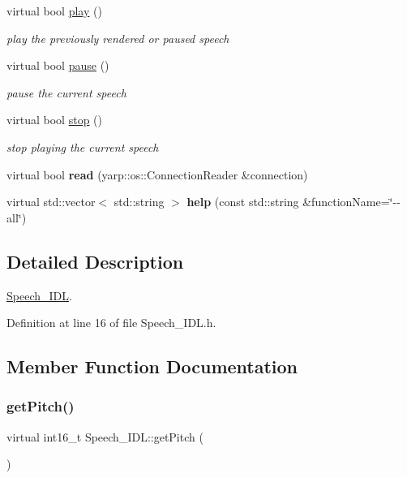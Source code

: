 \begin{DoxyCompactItemize}
\mbox{\label{classSpeech__IDL_a9b3187a4d3fd105cef6af2c71cde0eb6}} 
virtual bool \hyperlink{classSpeech__IDL_a9b3187a4d3fd105cef6af2c71cde0eb6}{play} ()
\begin{DoxyCompactList}\small\item\em play the previously rendered or paused speech \end{DoxyCompactList}\item 
\mbox{\label{classSpeech__IDL_adf9121298211c3f5e566fa110ca1e4b4}} 
virtual bool \hyperlink{classSpeech__IDL_adf9121298211c3f5e566fa110ca1e4b4}{pause} ()
\begin{DoxyCompactList}\small\item\em pause the current speech \end{DoxyCompactList}\item 
\mbox{\label{classSpeech__IDL_ac1fc021a6936bf5fd650e41a298d2bec}} 
virtual bool \hyperlink{classSpeech__IDL_ac1fc021a6936bf5fd650e41a298d2bec}{stop} ()
\begin{DoxyCompactList}\small\item\em stop playing the current speech \end{DoxyCompactList}\item 
\mbox{\label{classSpeech__IDL_aa8c2f07970c4db9f3aa0206575bc43b3}} 
virtual bool {\bfseries read} (yarp\+::os\+::\+Connection\+Reader \&connection)
\item 
\mbox{\label{classSpeech__IDL_afac3d091f15a6847aa8edb7f8ddc7652}} 
virtual std\+::vector$<$ std\+::string $>$ {\bfseries help} (const std\+::string \&function\+Name=\char`\"{}-\/-\/all\char`\"{})
\end{DoxyCompactItemize}


\subsection{Detailed Description}
\hyperlink{classSpeech__IDL}{Speech\+\_\+\+I\+DL}. 

Definition at line 16 of file Speech\+\_\+\+I\+D\+L.\+h.



\subsection{Member Function Documentation}
\mbox{\label{classSpeech__IDL_a273ed2a855520a7ab6babcb6bffa02fc}} 
\subsubsection{\texorpdfstring{get\+Pitch()}{getPitch()}}
{\footnotesize\ttfamily virtual int16\+\_\+t Speech\+\_\+\+I\+D\+L\+::get\+Pitch (\begin{DoxyParamCaption}{ }\end{DoxyParamCaption})\hspace{0.3cm}{\ttfamily [virtual]}}



